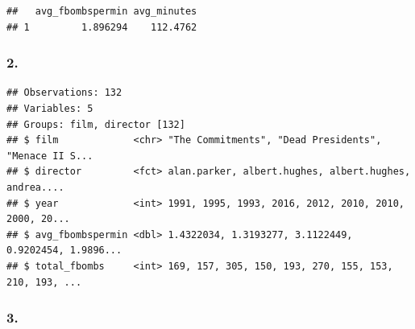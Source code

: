 \documentclass[]{article}
\newenvironment{Shaded}{\begin{snugshade}}{\end{snugshade}}
\newcommand{\DataTypeTok}[1]{\textcolor[rgb]{0.13,0.29,0.53}{#1}}
\newcommand{\DecValTok}[1]{\textcolor[rgb]{0.00,0.00,0.81}{#1}}
\newcommand{\KeywordTok}[1]{\textcolor[rgb]{0.13,0.29,0.53}{\textbf{#1}}}
\newcommand{\NormalTok}[1]{#1}
\newcommand{\OperatorTok}[1]{\textcolor[rgb]{0.81,0.36,0.00}{\textbf{#1}}}
\newcommand{\StringTok}[1]{\textcolor[rgb]{0.31,0.60,0.02}{#1}}
\begin{document}
\begin{Shaded}
\end{Shaded}

\begin{verbatim}
##   avg_fbombspermin avg_minutes
## 1         1.896294    112.4762
\end{verbatim}

\hypertarget{section-1}{%
\subsubsection{2.}\label{section-1}}

\begin{Shaded}
\end{Shaded}

\begin{verbatim}
## Observations: 132
## Variables: 5
## Groups: film, director [132]
## $ film             <chr> "The Commitments", "Dead Presidents", "Menace II S...
## $ director         <fct> alan.parker, albert.hughes, albert.hughes, andrea....
## $ year             <int> 1991, 1995, 1993, 2016, 2012, 2010, 2010, 2000, 20...
## $ avg_fbombspermin <dbl> 1.4322034, 1.3193277, 3.1122449, 0.9202454, 1.9896...
## $ total_fbombs     <int> 169, 157, 305, 150, 193, 270, 155, 153, 210, 193, ...
\end{verbatim}

\hypertarget{section-2}{%
\subsubsection{3.}\label{section-2}}
\end{document}
